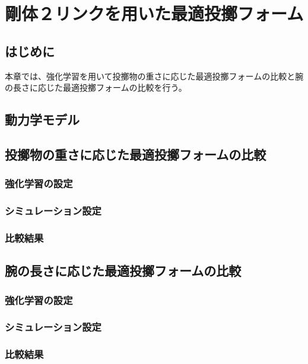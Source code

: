 \chapter[剛体２リンクによる最適投擲シミュレーション]{剛体２リンクを用いた最適投擲フォーム}

\section{はじめに}
本章では、強化学習を用いて投擲物の重さに応じた最適投擲フォームの比較と腕の長さに応じた最適投擲フォームの比較を行う。
\section{動力学モデル}
\section{投擲物の重さに応じた最適投擲フォームの比較}
\subsection{強化学習の設定}
\subsection{シミュレーション設定}
\subsection{比較結果}
\section{腕の長さに応じた最適投擲フォームの比較}
\subsection{強化学習の設定}
\subsection{シミュレーション設定}
\subsection{比較結果}